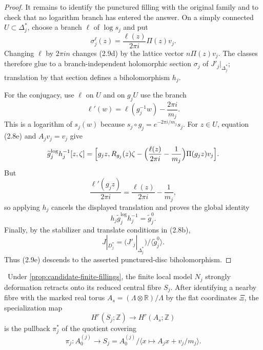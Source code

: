 \begin{proof}
It remains to identify the punctured filling with the original family and
to check that no logarithm branch has entered the answer.  On a simply
connected \(U\subset\Delta_j^*\), choose a branch \(\ell\) of
\(\log s_j\) and put
\[
 \sigma_j^\ell(z)=\frac{\ell(z)}{2\pi i}\Pi(z)v_j.
 \tag{2.9d}
\]
Changing \(\ell\) by \(2\pi in\) changes (2.9d) by the lattice vector
\(n\Pi(z)v_j\).  The classes therefore glue to a branch-independent
holomorphic section \(\sigma_j\) of \(J'_j|_{\Delta_j^*}\); translation by
that section defines a biholomorphism \(h_j\).

For the conjugacy, use \(\ell\) on \(U\) and on \(g_jU\) use the branch
\[
 \ell'(w)=\ell(g_j^{-1}w)-\frac{2\pi i}{m_j}.
\]
This is a logarithm of \(s_j(w)\) because
\(s_j\circ g_j=e^{-2\pi i/m_j}s_j\).  For \(z\in U\), equation (2.8e)
and \(A_jv_j=v_j\) give
\[
\begin{aligned}
 \widetilde g_j^{\log}h_j^{-1}[z,\zeta]
  =\Bigl[g_jz,R_{g_j}(z)\zeta
  -\Bigl(\frac{\ell(z)}{2\pi i}-\frac1{m_j}\Bigr)
    \Pi(g_jz)v_j\Bigr].
\end{aligned}
\]
But
\[
 \frac{\ell'(g_jz)}{2\pi i}
 =\frac{\ell(z)}{2\pi i}-\frac1{m_j},
\]
so applying \(h_j\) cancels the displayed translation and proves the
global identity
\[
 h_j\widetilde g_j^{\log}h_j^{-1}=\widetilde g_j^{0}.
 \tag{2.9e}
\]
Finally, by the stabilizer and translate conditions in (2.8b),
\[
 J|_{D_j^*}
 =\bigl(J'_j|_{\Delta_j^*}\bigr)/
   \langle\widetilde g_j^{0}\rangle.
\]
Thus (2.9e) descends to the asserted punctured-disc biholomorphism.
\end{proof}

\begin{lemma}
\label{lem:finite-filling-stalk-map}
\Verified\ Under \cref{prop:candidate-finite-fillings}, the finite local
model \(N_j\) strongly deformation retracts onto its reduced central fibre
\(S_j\).  After identifying a nearby fibre with the marked real torus
\(A_s=(\Lambda\otimes\mathbb R)/\Lambda\) by the flat coordinates
\(\Xi\), the specialization map
\[
 H^r(S_j;\mathbb Z)\longrightarrow H^r(A_s;\mathbb Z)
\]
is the pullback \(\pi_j^*\) of the quotient covering
\[
 \pi_j:A_0^{(j)}\longrightarrow
 S_j=A_0^{(j)}/\langle x\mapsto A_jx+v_j/m_j\rangle .
\]
\end{lemma}

